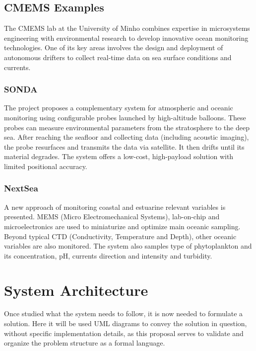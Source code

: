 \subsection{CMEMS Examples}
The CMEMS lab at the University of Minho combines expertise 
in microsystems engineering with environmental research to 
develop innovative ocean monitoring technologies. One of 
its key areas involves the design and deployment of autonomous 
drifters to collect real-time data on sea surface conditions 
and currents.

\subsubsection{SONDA}
The project proposes a complementary system for atmospheric
and oceanic monitoring using configurable probes launched by
high-altitude balloons. These probes can measure environmental
parameters from the stratosphere to the deep sea. After 
reaching the seafloor and collecting data (including acoustic 
imaging), the probe resurfaces and transmits the data via 
satellite. It then drifts until its material degrades. The 
system offers a low-cost, high-payload solution with 
limited positional accuracy.
\cite{sonda_optical}

\subsubsection{NextSea}
A new approach of monitoring coastal and estuarine relevant variables is presented. MEMS
(Micro Electromechanical Systems), lab-on-chip and microelectronics are used to 
miniaturize and optimize main oceanic sampling. Beyond typical CTD (Conductivity, Temperature
and Depth), other oceanic variables are also monitored. The system also samples type of
phytoplankton and its concentration, pH, currents direction and intensity and turbidity.
\cite{nextsea_lab}

\section{System Architecture}

Once studied what the system needs to follow, it is now needed to formulate a solution.
Here it will be used UML diagrams to convey the solution in question, without specific 
implementation details, as this proposal serves to validate and organize the problem 
structure as a formal language.

